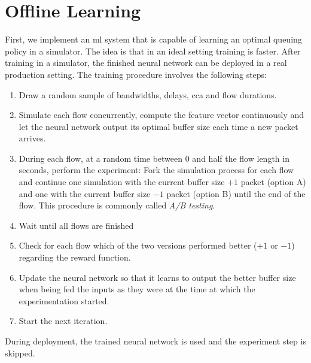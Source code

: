 \documentclass[conference]{IEEEtran}
\begin{document}
\section{Offline Learning}
\label{sec:offlineLearning}

First, we implement an \gls{ml} system that is capable of learning an optimal queuing policy in a simulator. The idea is that in an ideal setting training is faster. After training in a simulator, the finished neural network can be deployed in a real production setting. The training procedure involves the following steps:
\begin{enumerate}[wide, labelwidth=!, labelindent=0pt]
\item Draw a random sample of bandwidths, delays, \gls{cca} and flow durations.
\item Simulate each flow concurrently, compute the feature vector continuously and let the neural network output its optimal buffer size each time a new packet arrives. 
\item During each flow, at a random time between 0 and half the flow length in seconds, perform the experiment: Fork the simulation process for each flow and continue one simulation with the current buffer size $+1$ packet (option A) and one with the current buffer size $-1$ packet (option B) until the end of the flow. This procedure is commonly called \textit{A/B testing}.  
\item Wait until all flows are finished
\item Check for each flow which of the two versions performed better ($+1$ or $-1$) regarding the reward function.
\item Update the neural network so that it learns to output the better buffer size when being fed the inputs as they were at the time at which the experimentation started.
\item Start the next iteration. 
\end{enumerate}

During deployment, the trained neural network is used and the experiment step is skipped. 
\end{document}
